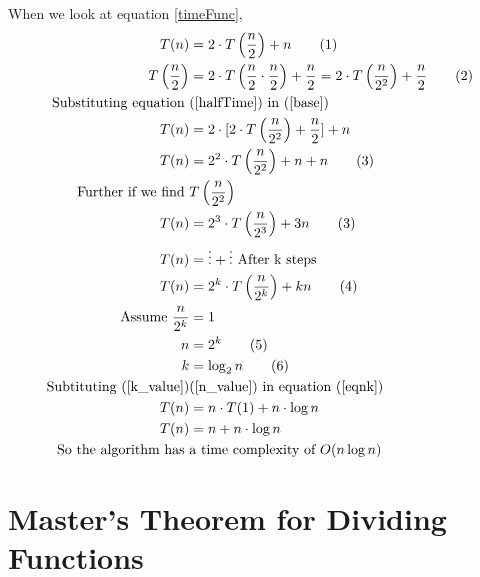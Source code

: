 \documentclass[]{article}
\theoremstyle{plain}
\theoremstyle{definition}
\begin{document}
When we look at equation \ref{timeFunc}, 
\begin{align*}
    T(n) &= 2\cdot T\left(\frac{n}{2}\right) + n \tag{1} \label{base}\\ 
    T\left(\frac{n}{2}\right) &= 2\cdot T\left(\frac{n}{2} \cdot \frac{n}{2}\right) + \frac{n}{2} = 2\cdot T\left(\frac{n}{2^2}\right) + \frac{n}{2} \tag{2} \label{halfTime}
    \\
    \text {Substituting equation } &\text{(\ref{halfTime}) in (\ref{base})}\\
    T(n) &= 2\cdot [2\cdot T\left(\frac{n}{2^2}\right) + \frac{n}{2} ] + n\\
    T(n) &= 2^2\cdot T\left(\frac{n}{2^2}\right) + n  + n \tag{3} \label{eqn2}\\
    \text{Further if we find } &T\left(\frac{n}{2^2}\right)\\
    T(n) &= 2^3\cdot T\left(\frac{n}{2^3}\right) + 3n \tag{3} \label{eqn2}\\
    T(n) &= \vdots  + \vdots \text { After k steps} \\ 
    T(n) &= 2^k \cdot T\left(\frac{n}{2^k}\right) + kn \tag{4} \label{eqnk}\\
    \text{Assume } \frac{n}{2^k} &= 1\\
    n &= 2^k \tag{5} \label{n_value}\\ 
    k &= \log_2{n} \tag{6} \label{k_value} \\
    \text{Subtituting  (\ref{k_value})}& \text{(\ref{n_value}) in equation (\ref{eqnk})}\\
    T(n) &= n \cdot T(1) + n\cdot \log{n}\\
    T(n) &= n + n\cdot \log{n}\\
    \text{So the algorithm has } &\text{a time complexity of } O(n\log n)
\end{align*}

\section{Master's Theorem for Dividing Functions}
\end{document}
